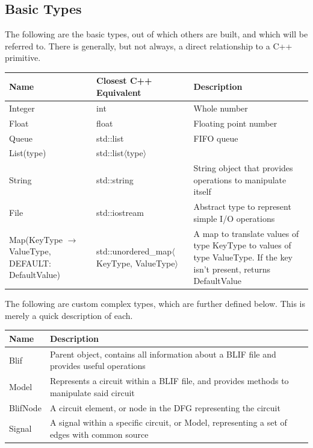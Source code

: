 \documentclass[12pt,final,oneside]{dwThesis} %
\begin{document}
   \subsection{Basic Types}
   The following are the basic types, out of which others are built, and which will be referred to. There is generally, but not always, a direct relationship to a C++ primitive.
   \begin{table}
      \begin{tabularx}{\linewidth}{XXX}
         \toprule
         Name & Closest C++ Equivalent & Description\\
         \midrule
         Integer &  int & Whole number \\
         Float & float & Floating point number \\
         Queue & std::list & FIFO queue \\
         List(type) & std::list$\langle$type$\rangle$ & \\
         String & std::string & String object that provides operations to manipulate itself \\
         File & std::iostream & Abstract type to represent simple I/O operations \\
         Map(KeyType $\to$ ValueType, DEFAULT:  DefaultValue) & std::unordered\_map$\langle$KeyType, ValueType$\rangle$ &  A map to translate values of type KeyType to values of type ValueType. If the key isn't present, returns DefaultValue \\
         \bottomrule
      \end{tabularx}
   \end{table}
   The following are custom complex types, which are further defined below. This is merely a quick description of each.
   \begin{table}
      \begin{tabularx}{\linewidth}{lX}
         \toprule
         Name & Description\\
         \midrule
         Blif & Parent object, contains all information about a \ac{BLIF} file and provides useful operations \\
         Model & Represents a circuit within a \ac{BLIF} file, and provides methods to manipulate said circuit \\
         BlifNode & A circuit element, or node in the \ac{DFG} representing the circuit \\
         Signal & A signal within a specific circuit, or Model, representing a set of edges with common source \\
         \bottomrule
      \end{tabularx}
   \end{table}
\end{document}
